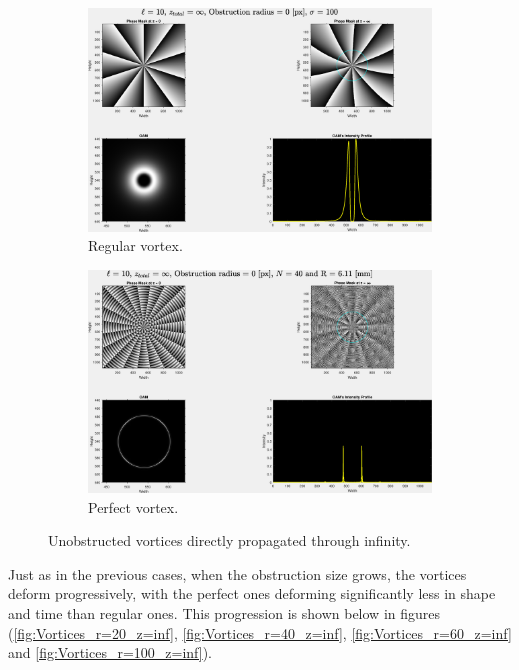 \begin{figure}[htbp]
    \centering
    \begin{subfigure}[b]{0.45\textwidth}
        \centering
        \includegraphics[width=\textwidth]{images/c04/type=0_r=0_zi=0_zf=Inf.eps}
        \caption{Regular vortex.}
    \end{subfigure}
    \hfill
    \begin{subfigure}[b]{0.45\textwidth}
        \centering
        \includegraphics[width=\textwidth]{images/c04/type=1_r=0_zi=0_zf=Inf.eps}
        \caption{Perfect vortex.}
    \end{subfigure}
    \caption{Unobstructed vortices directly propagated through infinity.}
    \label{fig:Vortices_r=0_z=inf}
\end{figure}

Just as in the previous cases, when the obstruction size grows, the vortices deform progressively, with the perfect ones deforming significantly less in shape and time than regular ones. This progression is shown below in figures (\ref{fig:Vortices_r=20_z=inf}, \ref{fig:Vortices_r=40_z=inf}, \ref{fig:Vortices_r=60_z=inf} and \ref{fig:Vortices_r=100_z=inf}).

